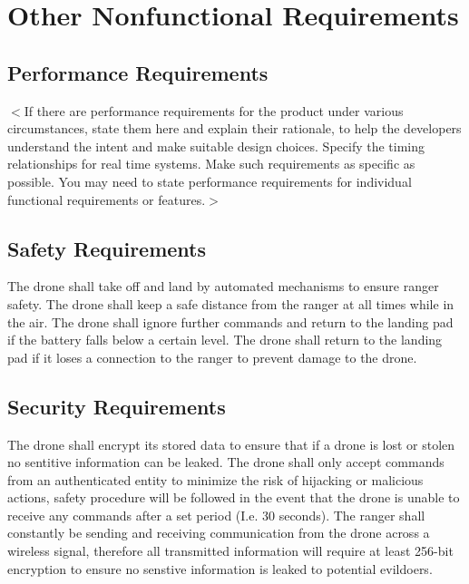 \chapter{Other Nonfunctional Requirements}

\section{Performance Requirements}
$<$If there are performance requirements for the product under various
circumstances, state them here and explain their rationale, to help the
developers understand the intent and make suitable design choices. Specify the
timing relationships for real time systems. Make such requirements as specific
as possible. You may need to state performance requirements for individual
functional requirements or features.$>$

\section{Safety Requirements}
The drone shall take off and land by automated mechanisms to ensure ranger safety.
\newline
The drone shall keep a safe distance from the ranger at all times while in the air.
\newline
The drone shall ignore further commands and return to the landing pad if the battery falls below a certain level.
\newline
The drone shall return to the landing pad if it loses a connection to the ranger to prevent damage to the drone.
\newline

\section{Security Requirements}
The drone shall encrypt its stored data to ensure that if a drone is lost or stolen no sentitive information can be leaked.
\newline
The drone shall only accept commands from an authenticated entity to minimize the risk of hijacking or malicious actions, 
safety procedure will be followed in the event that the drone is unable to receive any commands after a set period (I.e. 30 seconds).
\newline
The ranger shall constantly be sending and receiving communication from the drone across a wireless signal,
therefore all transmitted information will require at least 256-bit encryption to ensure no senstive information is leaked to potential evildoers.
\newline

